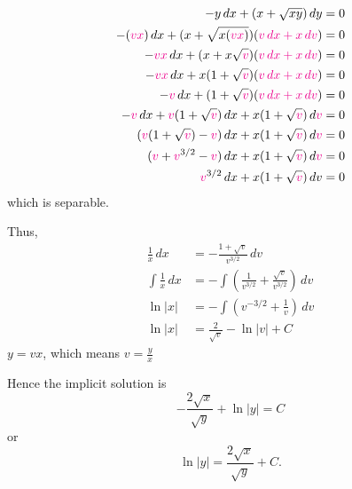 \documentclass[a4paper,11pt,reqno]{amsart}
\numberwithin{equation}{section}
\begin{document}
\begin{center}
{{\begin{minipage}{0.45\linewidth}
    \begin{align*}
      -y\,dx+(x+\sqrt{xy})\,dy &=0 \\
      -(\textcolor{magenta}{vx})\,dx+(x+\sqrt{x(\textcolor{magenta}{vx})})(\textcolor{magenta}{v\,dx+x\,dv}) &=0 \\
      -\textcolor{magenta}{vx}\,dx+(x+x\sqrt{\textcolor{magenta}{v}})(\textcolor{magenta}{v\,dx+x\,dv}) &= 0 \\
      -\textcolor{magenta}{vx}\,dx+x(1+\sqrt{\textcolor{magenta}{v}})(\textcolor{magenta}{v\,dx+x\,dv}) &= 0 \\
      -\textcolor{magenta}{v}\,dx+(1+\sqrt{\textcolor{magenta}{v}})(\textcolor{magenta}{\textcolor{magenta}{v}\,dx+x\,d\textcolor{magenta}{v}}) &= 0 \\
      -\textcolor{magenta}{v}\,dx+\textcolor{magenta}{v}(1+\sqrt{\textcolor{magenta}{v}})\,dx+x(1+\sqrt{\textcolor{magenta}{v}})\,d\textcolor{magenta}{v} &= 0 \\
      (\textcolor{magenta}{v}(1+\sqrt{\textcolor{magenta}{v}})-\textcolor{magenta}{v})\,dx+x(1+\sqrt{\textcolor{magenta}{v}})\,d\textcolor{magenta}{v} &= 0 \\
      (\textcolor{magenta}{v}+\textcolor{magenta}{v}^{3/2}-\textcolor{magenta}{v})\,dx+x(1+\sqrt{\textcolor{magenta}{v}})\,d\textcolor{magenta}{v} &= 0 \\
      \textcolor{magenta}{v}^{3/2}\,dx+x(1+\sqrt{\textcolor{magenta}{v}})\,dv &= 0
    \end{align*}
    which is separable.
    \end{minipage}
    \hfill
    \vline
    \hfill
    \begin{minipage}{0.45\linewidth}
      Thus,
    \begin{align*}
      \frac{1}{x}\,dx &=-\frac{1+\sqrt{v}}{v^{3/2}}\,dv\\
      \int \frac{1}{x}\,dx &=- \int \left(\frac{1}{v^{3/2}}+\frac{\sqrt{v}}{v^{3/2}}\right)\,dv \\
      \ln |x| &=- \int \left(v^{-3/2}+ \frac{1}{v}\right)\,dv \\
      \ln |x| &= \frac{2}{\sqrt{v}} - \ln |v| + C
    \end{align*}
    \(y=vx\), which means \(v=\frac{y}{x}\)

\vspace{0.5cm}

    Hence the implicit solution is
    \[-\frac{2\sqrt{x}}{\sqrt{y}}+\ln |y|=C\]
    or
    \[
    \ln |y|=\frac{2\sqrt{x}}{\sqrt{y}}+C.
    \]

    \end{minipage}
    }}
    \end{center}
\end{document}

